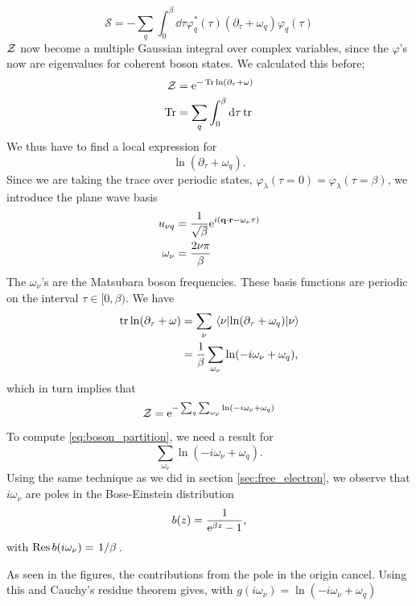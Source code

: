 \begin{equation}
\mathcal{S} = -\sum_{q}\int_0^\beta\dd{\tau}\varphi_{q}^*(\tau)\left(\partial_{\tau} + \omega_q\right)\varphi_{q}(\tau)
\end{equation}
\(\mathcal{Z}\) now become a multiple Gaussian integral over complex variables, since the $\varphi$'s now are eigenvalues for coherent boson states. We calculated this before;
\begin{align*}
\mathcal{Z} &= \mathrm{e}^{-\Tr\ln(\partial_\tau + \omega)} \\
\Tr &= \sum_q\int_0^\beta\dd{\tau}\tr
\end{align*}
We thus have to find a local expression for 
\begin{equation}
\ln(\partial_\tau + \omega_q).
\end{equation}
Since we are taking the trace over periodic states, \(\varphi_\lambda(\tau =0) = \varphi_\lambda(\tau =\beta)\), we introduce the plane wave basis
\begin{align*}
u_{\nu q} &= \frac{1}{\sqrt{\beta}}\mathrm{e}^{i(\vb q\cdot \vb{r} - \omega_\nu\tau)}\\
\omega_\nu &= \frac{2\nu\pi}{\beta}
\end{align*}
The \(\omega_\nu\)'s are the Matsubara boson frequencies. These basis functions are periodic on the interval \( \tau \in [0,\beta) \).
We have
\begin{align*}
\tr\ln(\partial_\tau + \omega) &= \sum_\nu \ev{\ln(\partial_\tau + \omega_q)}{\nu}\\
&=\frac{1}{\beta}\sum_{\omega_\nu}\ln(-i\omega_\nu + \omega_q),
\end{align*}
which in turn implies that
\begin{equation}
\label{eq:boson_partition}
\mathcal{Z} = \mathrm{e}^{-\sum_{q}\sum_{\omega_\nu}\ln(-i\omega_\nu+\omega_q)}
\end{equation}

To compute \eqref{eq:boson_partition}, we need a result for
\begin{equation}
\sum_{\omega_\nu}\ln(-i\omega_\nu +\omega_q).
\end{equation}
Using the same technique as we did in section \ref{sec:free_electron}, we observe that \(i\omega_\nu\) are poles in the Bose-Einstein distribution 
\begin{equation}
b(z) = \frac{1}{\mathrm{e}^{\beta z}-1},
\end{equation}
with \(\Res b(i\omega_\nu) = \flatfrac{1}{\beta} \).
\begin{figure}
	\centering
	
\end{figure}
\begin{figure}
	\centering
	
\end{figure}
As seen in the figures, the contributions from the pole in the origin cancel. Using this and Cauchy's residue theorem gives, with \(g(i\omega_\nu)=\ln(-i\omega_\nu + \omega_q)\)


